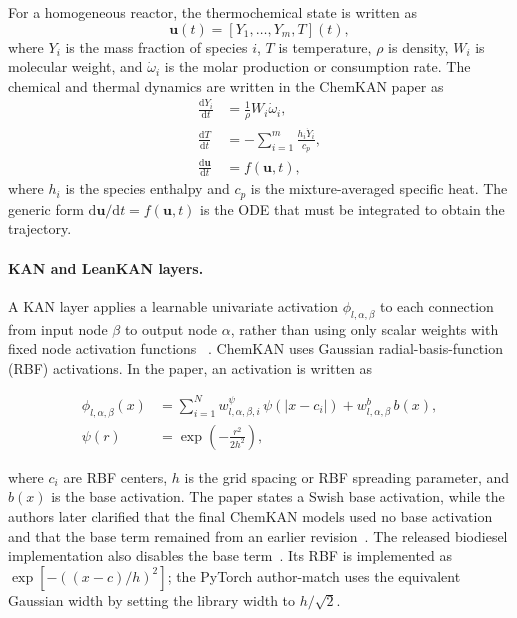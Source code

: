 \documentclass[11pt,a4paper]{article}
\newcommand{\dd}{\mathrm{d}}
\begin{document}
For a homogeneous reactor, the thermochemical state is written as
\begin{equation}
    \mathbf{u}(t)=[Y_1,\ldots,Y_m,T](t),
\end{equation}
where $Y_i$ is the mass fraction of species $i$, $T$ is temperature, $\rho$ is density, $W_i$ is molecular weight, and $\dot{\omega}_i$ is the molar production or consumption rate. The chemical and thermal dynamics are written in the ChemKAN paper as~\cite{Koenig_2025}
\begin{align}
    \frac{\dd Y_i}{\dd t} &= \frac{1}{\rho}W_i\dot{\omega}_i, \\
    \frac{\dd T}{\dd t} &= -\sum_{i=1}^{m}\frac{h_i\dot{Y}_i}{c_p}, \\
    \frac{\dd\mathbf{u}}{\dd t} &= f(\mathbf{u},t),
\end{align}
where $h_i$ is the species enthalpy and $c_p$ is the mixture-averaged specific heat. The generic form $\dd\mathbf{u}/\dd t=f(\mathbf{u},t)$ is the ODE that must be integrated to obtain the trajectory.

\paragraph{KAN and LeanKAN layers.}

A KAN layer applies a learnable univariate
activation $\phi_{l,\alpha,\beta}$ to each
connection from input node $\beta$ to output
node $\alpha$, rather than using only scalar
weights with fixed node activation functions
~\cite{ICLR2025_afaed896}. ChemKAN uses Gaussian radial-basis-function (RBF) activations. In the paper, an activation is written as~\cite{Koenig_2025}

\begin{align}
\phi_{l,\alpha,\beta}(x)
&=\sum_{i=1}^{N} w^{\psi}_{l,\alpha,\beta,i}\,\psi(|x-c_i|)
  +w^{b}_{l,\alpha,\beta}\,b(x),\\
\psi(r)&=\exp\!\left(-\frac{r^2}{2h^2}\right),
\end{align}

where $c_i$ are RBF centers, $h$ is the grid spacing or RBF spreading parameter, and $b(x)$ is the base activation. The paper states a Swish base activation, while the authors later clarified that the final ChemKAN models used no base activation and that the base term remained from an earlier revision~\cite{ChemKANAuthors2026}. The released biodiesel implementation also disables the base term~\cite{ChemKANRepo2026}. Its RBF is implemented as $\exp[-((x-c)/h)^2]$; the PyTorch author-match uses the equivalent Gaussian width by setting the library width to $h/\sqrt{2}$.
\end{document}
